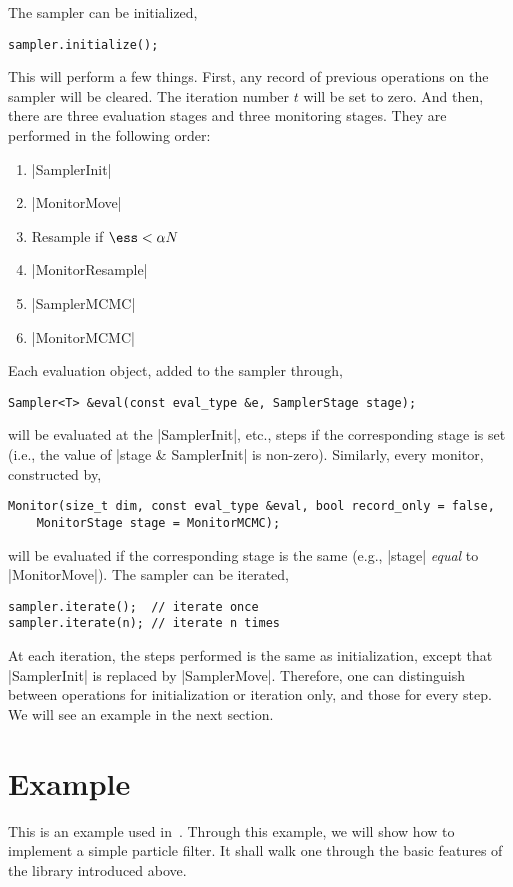 The sampler can be initialized,
\begin{verbatim}
sampler.initialize();
\end{verbatim}
This will perform a few things. First, any record of previous operations on the
sampler will be cleared. The iteration number $t$ will be set to zero. And
then, there are three evaluation stages and three monitoring stages. They are
performed in the following order:

\begin{enumerate}
  \item |SamplerInit|
  \item |MonitorMove|
  \item Resample if $\ess < \alpha N$
  \item |MonitorResample|
  \item |SamplerMCMC|
  \item |MonitorMCMC|
\end{enumerate}

Each evaluation object, added to the sampler through,
\begin{verbatim}
Sampler<T> &eval(const eval_type &e, SamplerStage stage);
\end{verbatim}
will be evaluated at the |SamplerInit|, etc., steps if the corresponding stage
is set (i.e., the value of |stage & SamplerInit| is non-zero). Similarly, every
monitor, constructed by,
\begin{verbatim}
Monitor(size_t dim, const eval_type &eval, bool record_only = false,
    MonitorStage stage = MonitorMCMC);
\end{verbatim}
will be evaluated if the corresponding stage is the same (e.g., |stage|
\emph{equal} to |MonitorMove|). The sampler can be iterated,
\begin{verbatim}
sampler.iterate();  // iterate once
sampler.iterate(n); // iterate n times
\end{verbatim}
At each iteration, the steps performed is the same as initialization, except
that |SamplerInit| is replaced by |SamplerMove|. Therefore, one can distinguish
between operations for initialization or iteration only, and those for every
step. We will see an example in the next section.

\section{Example}
\label{sec:Example (PF)}

This is an example used in~\cite{Johansen:2009wd}. Through this example, we
will show how to implement a simple particle filter. It shall walk one through
the basic features of the library introduced above.

